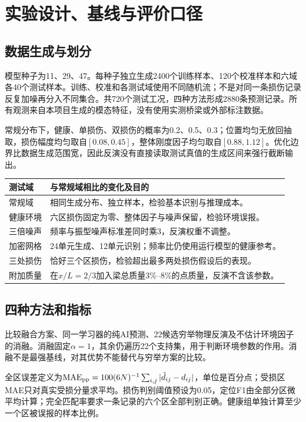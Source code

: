 \documentclass[UTF8,a4paper,11pt,fontset=fandol]{ctexart}
\begin{document}
\newpage
\section{实验设计、基线与评价口径}
\subsection{数据生成与划分}
模型种子为11、29、47。每种子独立生成2400个训练样本、120个校准样本和六域各40个测试样本。训练、校准和各测试域使用不同随机流；不是对同一条损伤记录反复加噪再分入不同集合。共720个测试工况，四种方法形成2880条预测记录。所有观测来自本项目生成的模态特征，没有使用实测桥梁或外部标注数据。

常规分布下，健康、单损伤、双损伤的概率为0.2、0.5、0.3；位置均匀无放回抽取，损伤幅度均匀取自$[0.08,0.45]$，整体刚度因子均匀取自$[0.88,1.12]$。优化边界比数据生成范围宽，因此反演没有直接读取测试真值的生成区间来强行截断输出。
\begin{center}\small\begin{tabular}{p{23mm}p{114mm}}\toprule
测试域 & 与常规域相比的变化及目的\\\midrule
常规域 & 相同生成分布、独立样本，检验基本识别与推理成本。\\
健康环境 & 六区损伤固定为零、整体因子与噪声保留，检验环境误报。\\
三倍噪声 & 频率与振型噪声标准差同时乘3，反演权重不调整。\\
加密网格 & 24单元生成、12单元识别；频率比仍使用运行模型的健康参考。\\
三处损伤 & 恰好三个区损伤，检验超出最多两处损伤假设后的表现。\\
附加质量 & 在$x/L=2/3$加入梁总质量3\%--8\%的点质量，反演不含该参数。\\\bottomrule
\end{tabular}\end{center}
\subsection{四种方法和指标}
比较融合方案、同一学习器的纯AI预测、22候选穷举物理反演及不估计环境因子的消融。消融固定$\alpha=1$，其余仍遍历22个支持集，用于判断环境参数的作用。消融不是最强基线，对其优势不能替代与穷举方案的比较。

全区误差定义为$\mathrm{MAE}_{\rm pp}=100(6N)^{-1}\sum_{i,j}|\hat d_{ij}-d_{ij}|$，单位是百分点；受损区MAE只对真实受损分量求平均。损伤判别阈值预设为0.05，定位F1由全部分区微平均计算；完全匹配率要求一条记录的六个区全部判别正确。健康组单独计算至少一个区被误报的样本比例。
\end{document}
